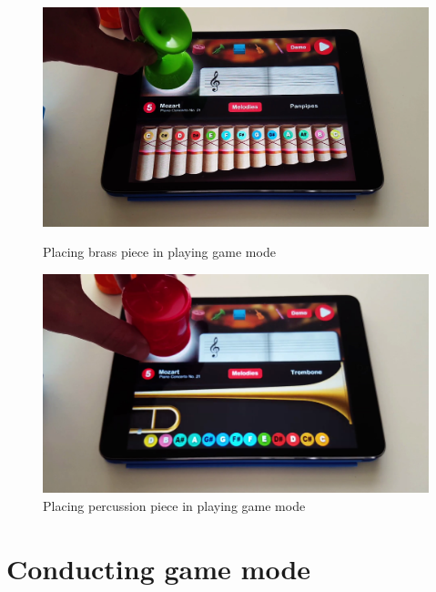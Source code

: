 \begin{figure}[ht!]
  \centering
  \includegraphics[width=350pt]{graphics/game-play/change_brass_playing.png}
  \vspace{0.05cm}
  \caption{Placing brass piece in playing game mode}
  \vspace{1cm}

  \includegraphics[width=350pt]{graphics/game-play/change_percussion_playing.png}
  \vspace{0.05cm}
  \caption{Placing percussion piece in playing game mode}
\end{figure}

\section{Conducting game mode}

